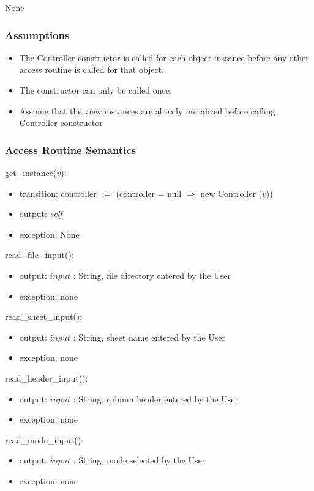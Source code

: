 \documentclass[12pt]{article}
\begin{document}
None

\subsubsection* {Assumptions}

\begin{itemize}
  \item The Controller constructor is called for each object instance before any
  other access routine is called for that object.  
  \item The constructor can only be called once.
  \item Assume that the view instances are already initialized before calling 
  Controller constructor
\end{itemize}

\subsubsection* {Access Routine Semantics}

get\_instance($v$):
\begin{itemize}
  \item transition: controller $:=$ (controller = null $\Rightarrow$ new Controller ($v$))
  \item output: \textit{self}
  \item exception: None
\end{itemize}

\noindent read\_file\_input():
\begin{itemize}
  \item output: $input$ : String, file directory entered by the User
  \item exception: none
\end{itemize}

\noindent read\_sheet\_input():
\begin{itemize}
  \item output: $input$ : String, sheet name entered by the User
  \item exception: none
\end{itemize}

\noindent read\_header\_input():
\begin{itemize}
  \item output: $input$ : String, column header entered by the User
  \item exception: none
\end{itemize}

\noindent read\_mode\_input():
\begin{itemize}
  \item output: $input$ : String, mode selected by the User
  \item exception: none
\end{itemize}
\end{document}
